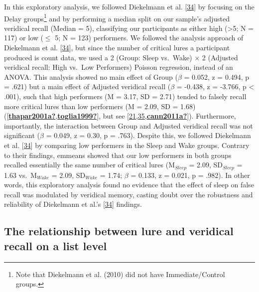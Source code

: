 \documentclass[
]{article}
\begin{document}
In this exploratory analysis, we followed Diekelmann et al. {[}\protect\hyperlink{ref-diekelmann2010a}{34}{]} by focusing on the Delay groups\footnote{Note that Diekelmann et al. (2010) did not have Immediate/Control groups.} and by performing a median split on our sample's adjusted veridical recall (Median = 5), classifying our participants as either high (\textgreater5; N = 117) or low (\(\leq\) 5; N = 123) performers. We followed the analysis approach of Diekelmann et al. {[}\protect\hyperlink{ref-diekelmann2010a}{34}{]}, but since the number of critical lures a participant produced is count data, we used a 2 (Group: Sleep vs.~Wake) \(\times\) 2 (Adjusted veridical recall: High vs.~Low Performers) Poisson regression, instead of an ANOVA. This analysis showed no main effect of Group (\(\beta\) = 0.052, z = 0.494, p = .621) but a main effect of Adjusted veridical recall (\(\beta\) = -0.438, z = -3.766, p \textless{} .001), such that high performers (M = 3.17, SD = 2.71) tended to falsely recall more critical lures than low performers (M = 2.09, SD = 1.68) ({[}\protect\hyperlink{ref-thapar2001a}{\textbf{thapar2001a?}},\protect\hyperlink{ref-toglia1999}{\textbf{toglia1999?}}{]}, but see {[}\protect\hyperlink{ref-roediger2001a}{21},\protect\hyperlink{ref-stadler1999a}{35},\protect\hyperlink{ref-cann2011a}{\textbf{cann2011a?}}{]}). Furthermore, importantly, the interaction between Group and Adjusted veridical recall was not significant (\(\beta\) = 0.049, z = 0.30, p = .763). Despite this, we followed Diekelmann et al. {[}\protect\hyperlink{ref-diekelmann2010a}{34}{]} by comparing low performers in the Sleep and Wake groups. Contrary to their findings, emmeans showed that our low performers in both groups recalled essentially the same number of critical lures (M\(_{Sleep}\) = 2.09, SD\(_{Sleep}\) = 1.63 vs.~M\(_{Wake}\) = 2.09, SD\(_{Wake}\) = 1.74; \(\beta\) = 0.133, z = 0.021, p = .982). In other words, this exploratory analysis found no evidence that the effect of sleep on false recall was modulated by veridical memory, casting doubt over the robustness and reliability of Diekelmann et al.'s {[}\protect\hyperlink{ref-diekelmann2010a}{34}{]} findings.

\hypertarget{the-relationship-between-lure-and-veridical-recall-on-a-list-level}{%
\subsection{The relationship between lure and veridical recall on a list level}\label{the-relationship-between-lure-and-veridical-recall-on-a-list-level}}
\end{document}
